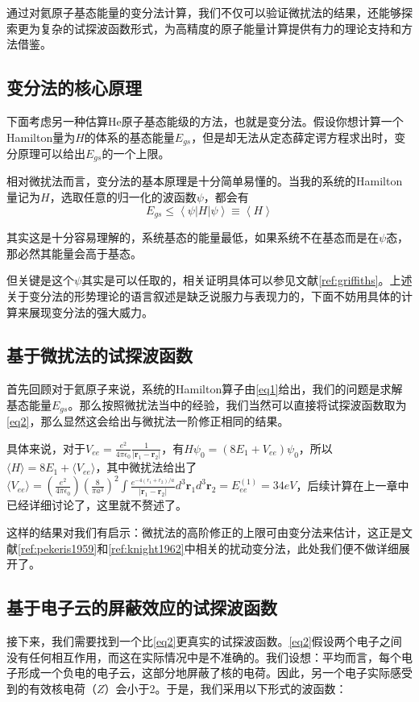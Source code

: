 通过对氦原子基态能量的变分法计算，我们不仅可以验证微扰法的结果，还能够探索更为复杂的试探波函数形式，为高精度的原子能量计算提供有力的理论支持和方法借鉴。

\subsection{变分法的核心原理}
下面考虑另一种估算He原子基态能级的方法，也就是变分法。假设你想计算一个Hamilton量为$H$的体系的基态能量$E_{gs}$，但是却无法从定态薛定谔方程求出时，变分原理可以给出$E_{gs}$的一个上限。

相对微扰法而言，变分法的基本原理是十分简单易懂的。当我的系统的Hamilton量记为$H$，选取任意的归一化的波函数$\psi$，都会有
\[
E_{gs}\leq\left \langle \psi |H|\psi \right \rangle \equiv \left \langle H \right \rangle
\]

其实这是十分容易理解的，系统基态的能量最低，如果系统不在基态而是在$\psi$态，那必然其能量会高于基态。

但关键是这个$\psi$其实是可以任取的，相关证明具体可以参见文献\cref{ref:griffiths}。上述关于变分法的形势理论的语言叙述是缺乏说服力与表现力的，下面不妨用具体的计算来展现变分法的强大威力。

\subsection{基于微扰法的试探波函数}
首先回顾对于氦原子来说，系统的Hamilton算子由\cref{eq1}给出，我们的问题是求解基态能量$E_{gs}$。那么按照微扰法当中的经验，我们当然可以直接将试探波函数取为\cref{eq2}，那么显然这会给出与微扰法一阶修正相同的结果。

具体来说，对于$V_{ee}=\frac{e^2}{4 \pi \epsilon_0} \frac{1}{ \left |  \textbf{r}_1- \textbf{r}_2\right | }$，有$H \psi _0=(8E_1 +V_{ee}) \psi _0$，所以$\langle H \rangle = 8E_1 +\langle V_{ee} \rangle$，其中微扰法给出了$
\langle V_{ee} \rangle=(\frac{e^2}{4 \pi \epsilon_0}) (\frac{8}{\pi a^3})^2\int \frac{e^{-4(r_1+r_2)/a}}{\left | \textbf{r}_1 - \textbf{r}_2 \right | }d^3 \textbf{r}_1 d^3 \textbf{r}_2=E^{(1)}_{ee} =34eV$，后续计算在上一章中已经详细讨论了，这里就不赘述了。

这样的结果对我们有启示：微扰法的高阶修正的上限可由变分法来估计，这正是文献\cref{ref:pekeris1959}和\cref{ref:knight1962}中相关的扰动变分法，此处我们便不做详细展开了。

\subsection{基于电子云的屏蔽效应的试探波函数}
接下来，我们需要找到一个比\cref{eq2}更真实的试探波函数。\cref{eq2}假设两个电子之间没有任何相互作用，而这在实际情况中是不准确的。我们设想：平均而言，每个电子形成一个负电的电子云，这部分地屏蔽了核的电荷。因此，另一个电子实际感受到的有效核电荷（$Z$）会小于2。于是，我们采用以下形式的波函数：

